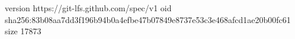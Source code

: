 version https://git-lfs.github.com/spec/v1
oid sha256:83b08aa7dd3f196b94b0a4efbe47b07849e8737e53c3e468afcd1ae20b00fc61
size 17873
